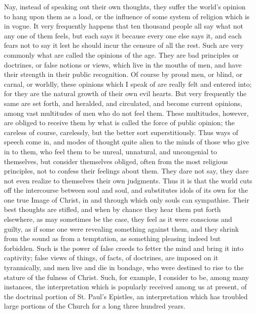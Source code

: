 Nay, instead of speaking out their own thoughts, they suffer the
world's opinion to hang upon them as a load, or the influence of some
system of religion which is in vogue. It very frequently happens that
ten thousand people all say what not any one of them feels, but each
says it because every one else says it, and each fears not to say it
lest he should incur the censure of all the rest. Such are very
commonly what are called the opinions of the age. They are bad
principles or doctrines, or false notions or views, which live in the
mouths of men, and have their strength in their public recognition. Of
course by proud men, or blind, or carnal, or worldly, these opinions
which I speak of are really felt and entered into; for they are the
natural growth of their own evil hearts. But very frequently the same
are set forth, and heralded, and circulated, and become current
opinions, among vast multitudes of men who do not feel them. These
multitudes, however, are obliged to receive them by what is called the
force of public opinion; the careless of course, carelessly, but the
better sort superstitiously. Thus ways of speech come in, and modes of
thought quite alien to the minds of those who give in to them, who
feel them to be unreal, unnatural, and uncongenial to themselves, but
consider themselves obliged, often from the most religious principles,
not to confess their feelings about them. They dare not say, they dare
not even realize to themselves their own judgments. Thus it is that
the world cuts off the intercourse between soul and soul, and
substitutes idols of its own for the one true Image of Christ, in and
through which only souls can sympathise. Their best thoughts are
stifled, and when by chance they hear them put forth elsewhere, as may
sometimes be the case, they feel as it were conscious and guilty, as
if some one were revealing something against them, and they shrink
from the sound as from a temptation, as something pleasing indeed but
forbidden. Such is the power of false creeds to fetter the mind and
bring it into captivity; false views of things, of facts, of
doctrines, are imposed on it tyrannically, and men live and die in
bondage, who were destined to rise to the stature of the fulness of
Christ. Such, for example, I consider to be, among many instances, the
interpretation which is popularly received among us at present, of the
doctrinal portion of St. Paul's Epistles, an interpretation which has
troubled large portions of the Church for a long three hundred years.

